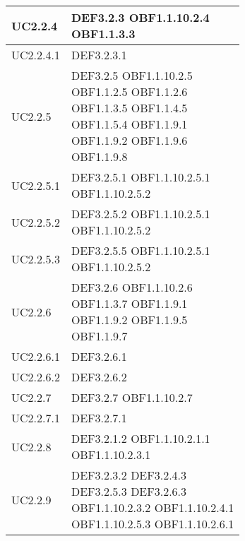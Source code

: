 \documentclass{scalatekids-article}
\begin{document}
\begin{longtable}[H]{|p{5.5cm}|p{5.5cm}|}
UC2.2.4 & \multiLineCell[t]{DEF3.2.3 OBF1.1.10.2.4\\OBF1.1.3.3\\}\\
\hline
UC2.2.4.1 & \multiLineCell[t]{DEF3.2.3.1\\}\\
\hline
UC2.2.5 & \multiLineCell[t]{DEF3.2.5 OBF1.1.10.2.5\\OBF1.1.2.5 OBF1.1.2.6\\OBF1.1.3.5 OBF1.1.4.5\\OBF1.1.5.4 OBF1.1.9.1\\OBF1.1.9.2 OBF1.1.9.6\\OBF1.1.9.8}\\
\hline
UC2.2.5.1 & \multiLineCell[t]{DEF3.2.5.1 OBF1.1.10.2.5.1\\OBF1.1.10.2.5.2\\}\\
\hline
UC2.2.5.2 & \multiLineCell[t]{DEF3.2.5.2 OBF1.1.10.2.5.1\\OBF1.1.10.2.5.2\\}\\
\hline
UC2.2.5.3 & \multiLineCell[t]{DEF3.2.5.5 OBF1.1.10.2.5.1\\OBF1.1.10.2.5.2\\}\\
\hline
UC2.2.6 & \multiLineCell[t]{DEF3.2.6 OBF1.1.10.2.6\\OBF1.1.3.7 OBF1.1.9.1\\OBF1.1.9.2 OBF1.1.9.5\\OBF1.1.9.7}\\
\hline
UC2.2.6.1 & \multiLineCell[t]{DEF3.2.6.1\\}\\
\hline
UC2.2.6.2 & \multiLineCell[t]{DEF3.2.6.2\\}\\
\hline
UC2.2.7 & \multiLineCell[t]{DEF3.2.7 OBF1.1.10.2.7\\}\\
\hline
UC2.2.7.1 & \multiLineCell[t]{DEF3.2.7.1\\}\\
\hline
UC2.2.8 & \multiLineCell[t]{DEF3.2.1.2 OBF1.1.10.2.1.1\\OBF1.1.10.2.3.1}\\
\hline
UC2.2.9 & \multiLineCell[t]{DEF3.2.3.2 DEF3.2.4.3\\DEF3.2.5.3 DEF3.2.6.3\\OBF1.1.10.2.3.2 OBF1.1.10.2.4.1\\OBF1.1.10.2.5.3 OBF1.1.10.2.6.1\\}\\

\end{longtable}
\end{document}
